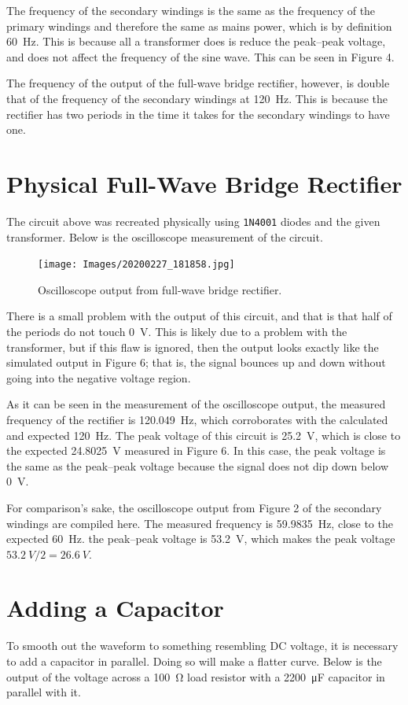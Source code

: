 \documentclass{article}
\begin{document}
The frequency of the secondary windings is the same as the
frequency of the primary windings and therefore the same as
mains power, which is
by definition \SI{60}{\hertz}. This is because all a
transformer does is reduce the peak--peak voltage, and does not
affect the frequency of the sine wave. This can be seen in
Figure 4.

The frequency of the output of the full-wave bridge rectifier,
however, is double that of the frequency of the secondary
windings at \SI{120}{\hertz}. This is because the rectifier
has two periods in the time it takes for the secondary
windings to have one.

\section{Physical Full-Wave Bridge Rectifier} The circuit above
was recreated physically using \texttt{1N4001} diodes and
the given transformer. Below is the oscilloscope measurement
of the circuit.

\begin{figure}[h]
    \centering
    \texttt{[image: Images/20200227\_181858.jpg]}
    \caption{Oscilloscope output from full-wave bridge rectifier.}
    \label{fig7}
\end{figure}

There is a small problem with the output of this circuit, and
that is that half of the periods do not touch \SI{0}{V}. This
is likely due to a problem with the transformer, but if this
flaw is ignored, then the output looks exactly like the simulated
output in Figure 6; that is, the signal bounces up and down
without going into the negative voltage region.

As it can be seen in the measurement of the oscilloscope output,
the measured frequency of the rectifier is \SI{120.049}{\hertz},
which corroborates with the calculated and expected
\SI{120}{\hertz}. The peak voltage of this circuit is
\SI{25.2}{V}, which is close to the expected \SI{24.8025}{V}
measured in Figure 6. In this case, the peak voltage is the
same as the peak--peak voltage because the signal does not
dip down below \SI{0}{V}.

For comparison's sake, the oscilloscope output from Figure 2
of the secondary windings are compiled here. The measured
frequency is \SI{59.9835}{\hertz}, close to the expected
\SI{60}{\hertz}. the peak--peak voltage is \SI{53.2}{V},
which makes the peak voltage
\( \SI{53.2}{V} / 2 = \SI{26.6}{V} \).

\section{Adding a Capacitor} To smooth out the waveform to
something resembling DC voltage, it is necessary to add
a capacitor in parallel. Doing so will make a flatter curve.
Below is the output of the voltage across a \SI{100}{\ohm}
load resistor with a \SI{2200}{\micro\farad} capacitor in
parallel with it.
\end{document}
